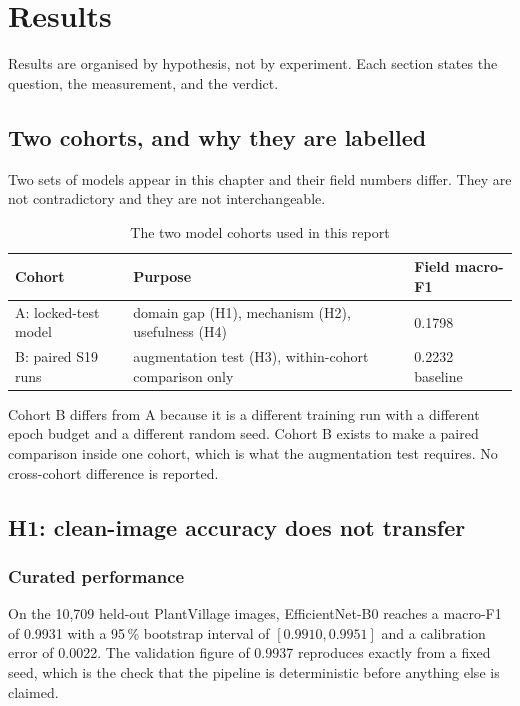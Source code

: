 
\chapter{Results}
\label{ch:results}

Results are organised by hypothesis, not by experiment. Each section states the
question, the measurement, and the verdict.

\section{Two cohorts, and why they are labelled}

Two sets of models appear in this chapter and their field numbers differ. They are
not contradictory and they are not interchangeable.

\begin{table}[H]
\centering
\caption{The two model cohorts used in this report}
\label{tab:cohorts}
\tabfont
\begin{tabularx}{\textwidth}{@{}lY l@{}}
\toprule
\textbf{Cohort} & \textbf{Purpose} & \textbf{Field macro-F1} \\
\midrule
A: locked-test model & domain gap (H1), mechanism (H2), usefulness (H4) & 0.1798 \\
B: paired S19 runs & augmentation test (H3), within-cohort comparison only & 0.2232 baseline \\
\bottomrule
\end{tabularx}
\end{table}

Cohort B differs from A because it is a different training run with a different
epoch budget and a different random seed. Cohort B exists to make a paired
comparison inside one cohort, which is what the augmentation test requires. No
cross-cohort difference is reported.

\section{H1: clean-image accuracy does not transfer}

\subsection{Curated performance}

On the 10,709 held-out PlantVillage images, EfficientNet-B0 reaches a macro-F1 of
0.9931 with a 95\,\% bootstrap interval of $[0.9910, 0.9951]$ and a calibration error
of 0.0022. The validation figure of 0.9937 reproduces exactly from a fixed seed,
which is the check that the pipeline is deterministic before anything else is
claimed.

